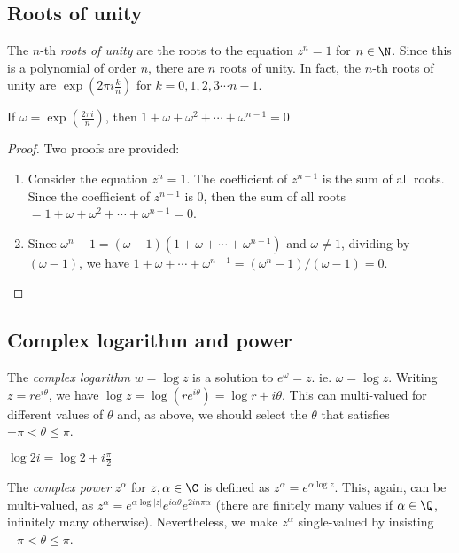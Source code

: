 \documentclass[a4paper]{article}
\begin{document}
\subsection{Roots of unity}
\begin{defi}
  The $n$-th \emph{roots of unity} are the roots to the equation $z^n = 1$ for $n\in \N$. Since this is a polynomial of order $n$, there are $n$ roots of unity. In fact, the $n$-th roots of unity are $\exp\left(2\pi i\frac{k}{n}\right)$ for $k = 0, 1, 2, 3\cdots n - 1$.
\end{defi}

\begin{prop}
  If $\omega = \exp\left(\frac{2\pi i}{n}\right)$, then $1 + \omega + \omega^2 + \cdots + \omega^{n - 1} = 0$
\end{prop}

\begin{proof}
  Two proofs are provided:
  \begin{enumerate}
    \item Consider the equation $z^n = 1$. The coefficient of $z^{n-1}$ is the sum of all roots. Since the coefficient of $z^{n-1}$ is 0, then the sum of all roots $= 1 + \omega + \omega^2 + \cdots + \omega^{n-1} = 0$.
    \item Since $\omega^n - 1 = (\omega - 1)(1 + \omega + \cdots + \omega^{n - 1})$ and $\omega \not= 1$, dividing by $(\omega - 1)$, we have $1 + \omega + \cdots + \omega^{n-1} = (\omega^n - 1)/(\omega - 1) = 0$.
  \end{enumerate}
\end{proof}

\subsection{Complex logarithm and power}
\begin{defi}
  The \emph{complex logarithm} $w = \log z$ is a solution to $e^\omega = z$. ie. $\omega = \log z$. Writing $z = re^{i\theta}$, we have $\log z = \log(re^{i\theta}) = \log r + i\theta$. This can multi-valued for different values of $\theta$ and, as above, we should select the $\theta$ that satisfies $-\pi < \theta \leq \pi$.
\end{defi}
\begin{eg}
  $\log 2i = \log 2 + i\frac{\pi}{2}$
\end{eg}

\begin{defi}
  The \emph{complex power} $z^\alpha$ for $z, \alpha\in \C$ is defined as $z^\alpha = e^{\alpha\log z}$. This, again, can be multi-valued, as $z^\alpha = e^{\alpha\log|z|}e^{i\alpha\theta}e^{2in\pi\alpha}$ (there are finitely many values if $\alpha\in\Q$, infinitely many otherwise). Nevertheless, we make $z^\alpha$ single-valued by insisting $-\pi < \theta \leq \pi$.
\end{defi}
\end{document}

